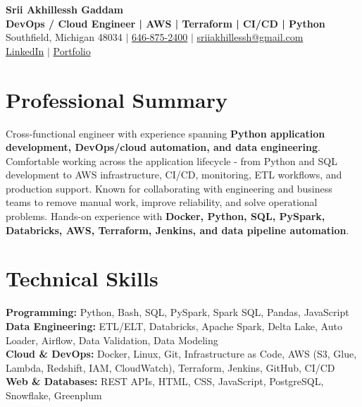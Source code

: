 \documentclass[letterpaper,10pt]{article}
\begin{document}
\fontsize{9.35pt}{10.45pt}\selectfont

\begin{center}
    {\LARGE \textbf{Srii Akhillessh Gaddam}} \\[-1pt]
    \textbf{DevOps / Cloud Engineer | AWS | Terraform | CI/CD | Python} \\[2pt]
    Southfield, Michigan 48034 $|$
    \href{tel:6468752400}{646-875-2400} $|$
    \href{mailto:sriiakhillessh@gmail.com}{sriiakhillessh@gmail.com} \\[1pt]
    \href{https://www.linkedin.com/in/srii-akhiilessh-gaddam-b48668191/}{LinkedIn} $|$
    \href{https://sriiakhillesshg.github.io/portfolio/}{Portfolio}
\end{center}
\vspace{-8pt}

\section{Professional Summary}
\small{Cross-functional engineer with experience spanning \textbf{Python application development, DevOps/cloud automation, and data engineering}. Comfortable working across the application lifecycle - from Python and SQL development to AWS infrastructure, CI/CD, monitoring, ETL workflows, and production support. Known for collaborating with engineering and business teams to remove manual work, improve reliability, and solve operational problems. Hands-on experience with \textbf{Docker, Python, SQL, PySpark, Databricks, AWS, Terraform, Jenkins, and data pipeline automation}.}

\section{Technical Skills}
\small{
\textbf{Programming:} Python, Bash, SQL, PySpark, Spark SQL, Pandas, JavaScript \\
\textbf{Data Engineering:} ETL/ELT, Databricks, Apache Spark, Delta Lake, Auto Loader, Airflow, Data Validation, Data Modeling \\
\textbf{Cloud \& DevOps:} Docker, Linux, Git, Infrastructure as Code, AWS (S3, Glue, Lambda, Redshift, IAM, CloudWatch), Terraform, Jenkins, GitHub, CI/CD \\
\textbf{Web \& Databases:} REST APIs, HTML, CSS, JavaScript, PostgreSQL, Snowflake, Greenplum
}
\end{document}
